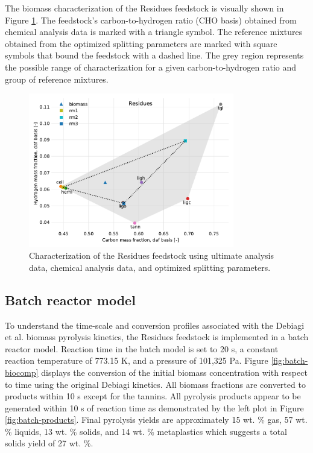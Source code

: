 The biomass characterization of the Residues feedstock is visually shown in Figure \ref{fig:biocomp-diagram}. The feedstock's carbon-to-hydrogen ratio (CHO basis) obtained from chemical analysis data is marked with a triangle symbol. The reference mixtures obtained from the optimized splitting parameters are marked with square symbols that bound the feedstock with a dashed line. The grey region represents the possible range of characterization for a given carbon-to-hydrogen ratio and group of reference mixtures.

\begin{figure}[H]
    \centering
    \includegraphics[width=0.8\textwidth]{figures/biocomp-diagram.pdf}
    \caption{Characterization of the Residues feedstock using ultimate analysis data, chemical analysis data, and optimized splitting parameters.}
    \label{fig:biocomp-diagram}
\end{figure}

\subsection{Batch reactor model}

To understand the time-scale and conversion profiles associated with the Debiagi et al. biomass pyrolysis kinetics, the Residues feedstock is implemented in a batch reactor model. Reaction time in the batch model is set to 20 s, a constant reaction temperature of 773.15 K, and a pressure of 101,325 Pa. Figure \ref{fig:batch-biocomp} displays the conversion of the initial biomass concentration with respect to time using the original Debiagi kinetics. All biomass fractions are converted to products within 10 s except for the tannins. All pyrolysis products appear to be generated within 10 s of reaction time as demonstrated by the left plot in Figure \ref{fig:batch-products}. Final pyrolysis yields are approximately 15 wt. \% gas, 57 wt. \% liquids, 13 wt. \% solids, and 14 wt. \% metaplastics which suggests a total solids yield of 27 wt. \%.

